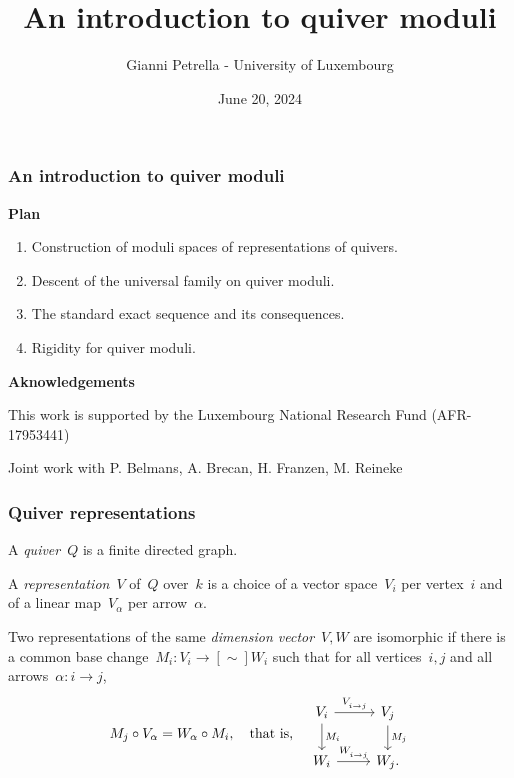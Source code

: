 \documentclass{beamer}
\title{An introduction to quiver moduli}
\institute{Seminar on Nonlinear Algebra - MPI MIS Leipzig}
\author{Gianni Petrella - University of Luxembourg}
\date{June 20, 2024}
\begin{document}
\begin{frame}
    \titlepage
\end{frame}
\begin{frame}
    \frametitle{An introduction to quiver moduli}
{\bf Plan}
    \begin{enumerate}
    \item Construction of moduli spaces of representations of quivers. \pause
    \item Descent of the universal family on quiver moduli. \pause
    \item The standard exact sequence and its consequences. \pause
    \item Rigidity for quiver moduli.
\end{enumerate} \pause
\vfill
{\bf Aknowledgements}

{\small This work is supported by the Luxembourg National Research Fund (AFR-17953441)}

{\small Joint work with P. Belmans, A. Brecan, H. Franzen, M. Reineke}
\end{frame}

\begin{frame}
    \frametitle{Quiver representations}
\begin{definition}
    A \emph{quiver}~$Q$ is a finite directed graph.

    A \emph{representation}~$V$ of~$Q$ over~$k$ is
    a choice of a vector space~$V_i$ per vertex~$i$
    and of a linear map~$V_{\alpha}$ per arrow~$\alpha$.
\end{definition} \pause

Two representations of the same \emph{dimension vector}~$V, W$
are isomorphic if there is a common base change~$M_i : V_i \to[\sim] W_i$
such that for all vertices~$i, j$ and all arrows~$\alpha : i \to j$,
\[M_j \circ V_{\alpha} = W_{\alpha}\circ M_i,~~~\text{that is,}~~~ \begin{tikzcd}[ampersand replacement=\&]
V_i \arrow[r, "V_{i \to j}"] \arrow[d, "M_i"] \& V_j \arrow[d, "M_j"] \\
W_i \arrow[r, "W_{i \to j}"] \& W_j.
\end{tikzcd} \]
\end{frame}
\end{document}
